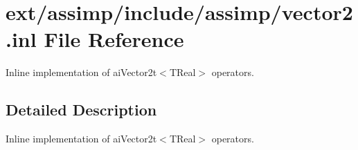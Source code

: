 \hypertarget{vector2_8inl}{\section{ext/assimp/include/assimp/vector2.inl File Reference}
\label{vector2_8inl}
}


Inline implementation of ai\-Vector2t$<$\-T\-Real$>$ operators.  




\subsection{Detailed Description}
Inline implementation of ai\-Vector2t$<$\-T\-Real$>$ operators. 